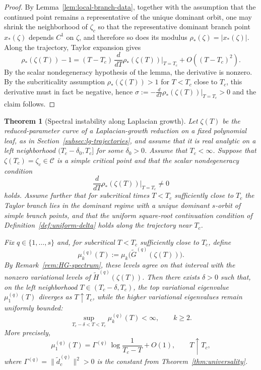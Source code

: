 \documentclass[11pt]{amsart}
\numberwithin{equation}{section}
\theoremstyle{plain}
\newtheorem{theorem}{Theorem}[section]
\theoremstyle{definition}
\theoremstyle{remark}
\begin{document}
\begin{proof}
	By Lemma~\ref{lem:local-branch-data}, together with the assumption that the continued point remains a representative of the unique dominant orbit, one may shrink the neighborhood of
	$\zeta_c$ so that the representative dominant branch point
	$x_*(\zeta)$ depends $C^1$ on $\zeta$, and therefore so does its
	modulus $\rho_*(\zeta)=|x_*(\zeta)|$.
	Along the trajectory, Taylor expansion gives
	\[
		\rho_*(\zeta(T))-1 = (T-T_c)\,\frac{d}{dT}\rho_*(\zeta(T))\big|_{T=T_c}+O((T-T_c)^2).
	\]
	By the scalar nondegeneracy hypothesis of the lemma, the derivative is nonzero. By the subcriticality assumption $\rho_*(\zeta(T))>1$ for $T<T_c$ close to $T_c$, this derivative must in fact be negative, hence $\sigma:=-\frac{d}{dT}\rho_*(\zeta(T))|_{T=T_c}>0$ and the claim follows.
\end{proof}

\begin{theorem}[Spectral instability along Laplacian growth]
	\label{thm:lg-spectral}
	Let $\zeta(T)$ be the reduced-parameter curve of a Laplacian-growth reduction
	on a fixed polynomial leaf, as in Section~\ref{subsec:lg-trajectories}, and
	assume that it is real analytic on a left neighborhood $(T_c-\delta_0,T_c]$
	for some $\delta_0>0$.
	Assume that $T_c<\infty$.
	Suppose that $\zeta(T_c)=\zeta_c\in\mathcal C$
	is a simple critical point and that the scalar nondegeneracy condition
	\[
		\frac{d}{dT}\rho_*(\zeta(T))\Big|_{T=T_c}\neq0
	\]
	holds. Assume further that for subcritical times $T<T_c$ sufficiently close to
	$T_c$ the Taylor branch lies in the dominant regime with a unique dominant
	$s$-orbit of simple branch points, and that the uniform square-root
	continuation condition of Definition~\ref{def:uniform-delta} holds along the
	trajectory near $T_c$.


	Fix $q\in\{1,\dots,s\}$ and, for subcritical $T<T_c$ sufficiently close to
	$T_c$, define
	\[
	\mu_k^{(q)}(T):=\mu_k\bigl(\widetilde G^{(q)}(\zeta(T))\bigr).
	\]
	By Remark~\ref{rem:HG-spectrum}, these levels agree on that interval with
	the nonzero variational levels of
	\(\widetilde H^{(q)}(\zeta(T))\).
	Then there exists $\delta>0$ such that, on the left neighborhood
	$T\in(T_c-\delta,T_c)$, the top variational eigenvalue
	$\mu_1^{(q)}(T)$ diverges as $T\uparrow T_c$, while the higher
	variational eigenvalues remain uniformly bounded:
	\[
		\sup_{T_c-\delta<T<T_c}\mu_k^{(q)}(T)<\infty,
		\qquad k\ge2.
	\]
	More precisely,
	\begin{equation}\label{eq:mu-lg}
		\mu_1^{(q)}(T)
		=
		\Gamma^{(q)}\,\log\frac{1}{T_c-T}+O(1),
		\qquad T\uparrow T_c,
	\end{equation}
	where $\Gamma^{(q)}=\|\widetilde d_c^{(q)}\|^2>0$ is the constant from
	Theorem~\ref{thm:universality}.
\end{theorem}
\end{document}
